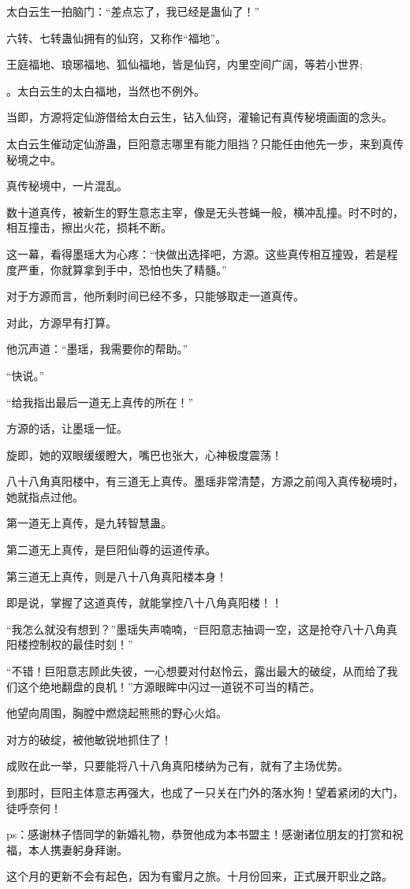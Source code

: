 \begin{this_body}
太白云生一拍脑门：“差点忘了，我已经是蛊仙了！”

六转、七转蛊仙拥有的仙窍，又称作“福地”。

王庭福地、琅琊福地、狐仙福地，皆是仙窍，内里空间广阔，等若小世界;

。太白云生的太白福地，当然也不例外。

当即，方源将定仙游借给太白云生，钻入仙窍，灌输记有真传秘境画面的念头。

太白云生催动定仙游蛊，巨阳意志哪里有能力阻挡？只能任由他先一步，来到真传秘境之中。

真传秘境中，一片混乱。

数十道真传，被新生的野生意志主宰，像是无头苍蝇一般，横冲乱撞。时不时的，相互撞击，擦出火花，损耗不断。

这一幕，看得墨瑶大为心疼：“快做出选择吧，方源。这些真传相互撞毁，若是程度严重，你就算拿到手中，恐怕也失了精髓。”

对于方源而言，他所剩时间已经不多，只能够取走一道真传。

对此，方源早有打算。

他沉声道：“墨瑶，我需要你的帮助。”

“快说。”

“给我指出最后一道无上真传的所在！”

方源的话，让墨瑶一怔。

旋即，她的双眼缓缓瞪大，嘴巴也张大，心神极度震荡！

八十八角真阳楼中，有三道无上真传。墨瑶非常清楚，方源之前闯入真传秘境时，她就指点过他。

第一道无上真传，是九转智慧蛊。

第二道无上真传，是巨阳仙尊的运道传承。

第三道无上真传，则是八十八角真阳楼本身！

即是说，掌握了这道真传，就能掌控八十八角真阳楼！！

“我怎么就没有想到？”墨瑶失声喃喃，“巨阳意志抽调一空，这是抢夺八十八角真阳楼控制权的最佳时刻！”

“不错！巨阳意志顾此失彼，一心想要对付赵怜云，露出最大的破绽，从而给了我们这个绝地翻盘的良机！”方源眼眸中闪过一道锐不可当的精芒。

他望向周围，胸膛中燃烧起熊熊的野心火焰。

对方的破绽，被他敏锐地抓住了！

成败在此一举，只要能将八十八角真阳楼纳为己有，就有了主场优势。

到那时，巨阳主体意志再强大，也成了一只关在门外的落水狗！望着紧闭的大门，徒呼奈何！

ps：感谢林子悟同学的新婚礼物，恭贺他成为本书盟主！感谢诸位朋友的打赏和祝福，本人携妻躬身拜谢。

这个月的更新不会有起色，因为有蜜月之旅。十月份回来，正式展开职业之路。

\end{this_body}

